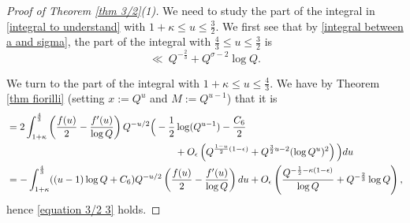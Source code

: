 \documentclass[12pt,reqno]{amsart}
\numberwithin{equation}{section}
\theoremstyle{plain}
\begin{document}
\begin{proof}[Proof of Theorem \ref{thm 3/2}(1)]
We need to study the part of the integral in \eqref{integral to understand} with $1+\kappa \leq u\leq  \frac 32.$
We first see that by \eqref{integral between a and sigma}, the part of the integral with $\frac 43 \leq u \leq \frac 32 $ is
\begin{equation} \ll\ Q^{-\frac 23} + Q^{\sigma-2}\log Q. \end{equation}

We turn to the part of the integral with $1+\kappa \leq u\leq  \frac 43.$ We have by Theorem \ref{thm fiorilli} (setting $x:=Q^u$ and $M:=Q^{u-1}$) that it is
\begin{align}\label{eq:1to43rdsetakappa} &=  2\int_{1+\kappa}^{\frac 43} \left(\frac {f(u)}2 -\frac {f'(u)}{\log Q}\right) Q^{-u/2}\Big( -\frac 12 \log (Q^{u-1})- \frac{C_6}2  \notag
\\ &\hspace{6cm}+ O_{\epsilon}\left(Q^{\frac{1-u}{2} (1-\epsilon)}+Q^{\frac 32 u-2}(\log Q^u)^2\right) \Big)du \nonumber\\
&=    -\int_{1+\kappa}^{\frac 43}(  (u-1)\log Q+C_6  ) Q^{-u/2} \left(\frac {f(u)}2 -\frac {f'(u)}{\log Q}\right) du + O_{\epsilon}\left(\frac{Q^{-\frac 12-\kappa(1-\epsilon)}}{\log Q}+Q^{-\frac 23}\log Q\right),
\end{align}
hence \eqref{equation 3/2 3} holds.

\end{proof}
\end{document}
